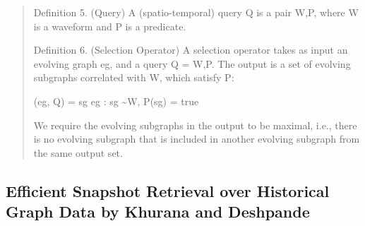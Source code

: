 \begin{quote}
Definition 5. (Query) A (spatio-temporal) query Q is a pair {W,P}, where W is a waveform and P is a predicate.

Definition 6. (Selection Operator) A selection operator takes as input an evolving graph eg, and a query Q = {W,P}. The output is a set of evolving subgraphs correlated with W, which satisfy P:

\sigma(eg, Q) = {sg \subseteq eg : sg \sim W, P(sg) = true}

We require the evolving subgraphs in the output to be maximal, i.e., there is no evolving subgraph that is included in another evolving subgraph from the same output set.
\end{quote}

\subsection{Efficient Snapshot Retrieval over Historical Graph Data by Khurana and Deshpande \cite{Khurana2013}}

